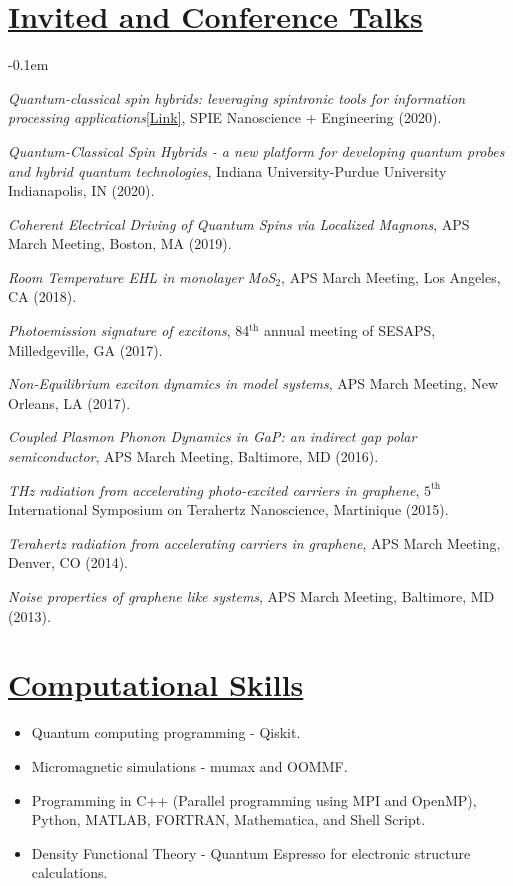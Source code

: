\documentclass[12pt]{article}
\begin{document}
\section*{\underline{Invited and Conference Talks}}
\begin{etaremune}
\itemsep-0.1em
\item \textit{Quantum-classical spin hybrids: leveraging spintronic tools for information processing applications}\href{https://doi.org/10.1117/12.2567795}{[Link]}, SPIE Nanoscience + Engineering (2020).

\item \textit{Quantum-Classical Spin Hybrids - a new platform for developing quantum probes and hybrid quantum technologies}, Indiana University-Purdue University Indianapolis, IN (2020).

\item \textit{Coherent Electrical Driving of Quantum Spins via Localized Magnons}, APS March Meeting, Boston, MA (2019).

\item \textit{Room Temperature EHL in monolayer MoS$_2$}, APS March Meeting, Los Angeles, CA (2018).

 \item \textit{Photoemission signature of excitons}, 84$^\mathrm{th}$ annual meeting of SESAPS, Milledgeville, GA (2017).

\item \textit{Non-Equilibrium exciton dynamics in model systems}, APS March Meeting, New Orleans, LA (2017).
 
\item \textit{Coupled Plasmon Phonon Dynamics in GaP: an indirect gap polar semiconductor}, APS March Meeting, Baltimore, MD (2016).

 \item \textit{THz radiation from accelerating photo-excited carriers in graphene}, $5^\mathrm{th}$ International Symposium on Terahertz Nanoscience, Martinique (2015).

\item \textit{Terahertz radiation from accelerating carriers in graphene}, APS March Meeting, Denver, CO (2014).

\item \textit{Noise properties of graphene like systems}, APS March Meeting, Baltimore, MD (2013).
 \end{etaremune}

\section*{\underline{Computational Skills}} 
\begin{itemize}
\itemsep-0.1em
\item Quantum computing programming - Qiskit.
\item Micromagnetic simulations - mumax and OOMMF.
\item Programming in C++ (Parallel programming using MPI and OpenMP), Python, MATLAB, FORTRAN, Mathematica, and Shell Script. 
\item Density Functional Theory - Quantum Espresso for electronic structure calculations.
\end{itemize}
\end{document}
